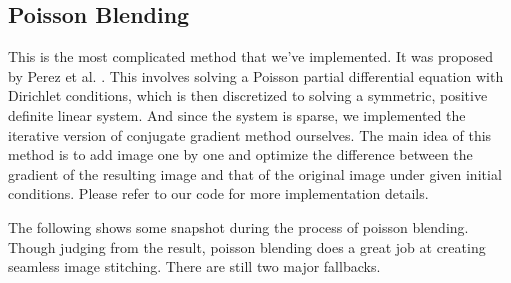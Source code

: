 \documentclass[a4paper]{article}
\begin{document}
\subsection{Poisson Blending}
This is the most complicated method that we've implemented. It was proposed by Perez
et al. \cite{Perez:2003:PIE:1201775.882269}. This involves solving a Poisson
partial differential equation with Dirichlet conditions, which is then discretized
to solving a symmetric, positive definite linear system. And since the system is
sparse, we implemented the iterative version of conjugate gradient method ourselves.
The main idea of this method is to add image one by one and optimize the difference
between the gradient of the resulting image and that of the original image under given
initial conditions. Please refer to our code for more implementation details.

The following shows some snapshot during the process of poisson blending.
Though judging from the result, poisson blending does a great job at creating
seamless image stitching. There are still two major fallbacks.
\end{document}

